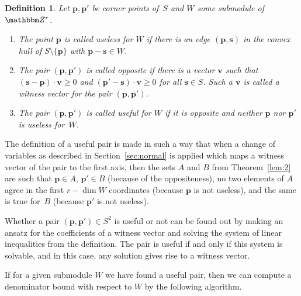 \documentclass[a4paper]{sig-alternate}
\let\set\mathbbm
\def\vec#1{\mathbf{#1}}
\newtheorem{definition}{Definition}
\begin{document}
\begin{definition} Let $\vec p,\vec p'$ be corner points of~$S$
  and $W$ some submodule of~$\set Z^r$.
  \begin{enumerate}
  \item The point $\vec p$ is called \emph{useless} for $W$ if there is an edge $(\vec p,\vec s)$
    in the convex hull of $S\setminus\{\vec p\}$ with $\vec p-\vec s\in W$.
  \item The pair $(\vec p,\vec p')$ is called \emph{opposite} if there is a vector $\vec v$
    such that $(\vec s-\vec p)\cdot\vec v\geq0$ and
    $(\vec p'-\vec s)\cdot\vec v\geq0$ for all $\vec s\in S$.
    Such a $\vec v$ is called a \emph{witness vector} for the pair $(\vec p,\vec p')$.
  \item The pair $(\vec p,\vec p')$ is called \emph{useful} for $W$ if it is opposite and neither
    $\vec p$ nor $\vec p'$ is useless for~$W$.
  \end{enumerate}
\end{definition}

The definition of a useful pair is made in such a way that when a change of variables as
described in Section~\ref{sec:normal} is applied which maps a witness vector of the pair
to the first axis, then the sets $A$ and $B$ from Theorem~\ref{lem:2} are such that
$\vec p\in A$, $\vec p'\in B$ (because of the oppositeness), no two elements of $A$
agree in the first $r-\dim W$ coordinates (because $\vec p$ is not useless), and the
same is true for~$B$ (because $\vec p'$ is not useless).

Whether a pair $(\vec p,\vec p')\in S^2$ is useful or not can be found out by making an
ansatz for the coefficients of a witness vector and solving the system of linear
inequalities from the definition. The pair is useful if and only if this system is
solvable, and in this case, any solution gives rise to a witness vector.

If for a given submodule $W$ we have found a useful pair, then we can compute a denominator
bound with respect to $W$ by the following algorithm.
\end{document}
